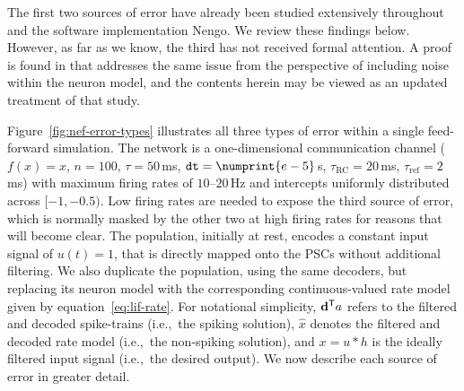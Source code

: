 The first two sources of error have already been studied extensively throughout \citet{eliasmith2003a} and the software implementation Nengo.
We review these findings below.
However, as far as we know, the third has not received formal attention.
A proof is found in \citet[][pp.~132--136, appendix~C.1]{eliasmith2003a} that addresses the same issue from the perspective of including noise within the neuron model, and the contents herein may be viewed as an updated treatment of that study.

Figure~\ref{fig:nef-error-types} illustrates all three types of error within a single feed-forward simulation.
The network is a one-dimensional communication channel ($f(x) = x$, $n = 100$, $\tau = 50$\,ms, $\dt{} = \numprint{e-5}$\,s, $\tau_\text{RC} = 20$\,ms, $\tau_\text{ref} = 2$\,ms) with maximum firing rates of $10$--$20$\,Hz and intercepts uniformly distributed across $[-1, -0.5)$.
Low firing rates are needed to expose the third source of error, which is normally masked by the other two at high firing rates for reasons that will become clear.
The population, initially at rest, encodes a constant input signal of $u(t) = 1$, that is directly mapped onto the PSCs without additional filtering.
We also duplicate the population, using the same decoders, but replacing its neuron model with the corresponding continuous-valued rate model given by equation~\ref{eq:lif-rate}.
For notational simplicity, ${\mathbf{d}}^\mathsf{T}a$ refers to the filtered and decoded spike-trains (i.e.,~the spiking solution), $\hat{x}$ denotes the filtered and decoded rate model (i.e.,~the non-spiking solution), and $x = u \ast h$ is the ideally filtered input signal (i.e.,~the desired output).
We now describe each source of error in greater detail.


